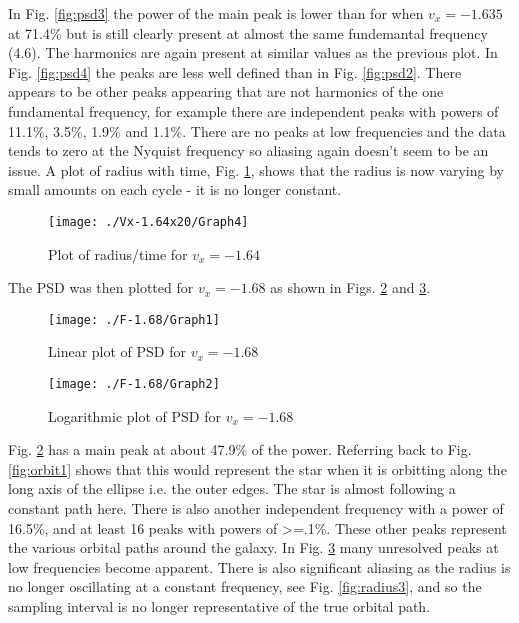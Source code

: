 \documentclass[a4paper,12pt]{article}
\begin{document}
In Fig. \ref{fig:psd3} the power of the main peak is lower than for when $v_x=-1.635$ at 71.4\% but is still clearly present at almost the same fundemantal frequency (4.6). The harmonics are again present at similar values as the previous plot. In Fig. \ref{fig:psd4} the peaks are less well defined than in Fig. \ref{fig:psd2}. There appears to be other peaks appearing that are not harmonics of the one fundamental frequency, for example there are independent peaks with powers of 11.1\%, 3.5\%, 1.9\% and 1.1\%. There are no peaks at low frequencies and the data tends to zero at the Nyquist frequency so aliasing again doesn't seem to be an issue. A plot of radius with time, Fig. \ref{fig:radius2}, shows that the radius is now varying by small amounts on each cycle - it is no longer constant.

\begin{figure}[H]
\centering
\texttt{[image: ./Vx-1.64x20/Graph4]}
\caption{Plot of radius/time for $v_x=-1.64$}
\label{fig:radius2}
\end{figure}

The PSD was then plotted for $v_x=-1.68$ as shown in Figs. \ref{fig:psd5} and \ref{fig:psd6}. 

\begin{figure}[H]
\centering
\texttt{[image: ./F-1.68/Graph1]}
\caption{Linear plot of PSD for $v_x=-1.68$}
\label{fig:psd5}
\end{figure}

\begin{figure}[H]
\centering
\texttt{[image: ./F-1.68/Graph2]}
\caption{Logarithmic plot of PSD for $v_x=-1.68$}
\label{fig:psd6}
\end{figure}

Fig. \ref{fig:psd5} has a main peak at about 47.9\% of the power. Referring back to Fig. \ref{fig:orbit1} shows that this would represent the star when it is orbitting along the long axis of the ellipse i.e. the outer edges. The star is almost following a constant path here. There is also another independent frequency with a power of 16.5\%, and at least 16 peaks with powers of \textgreater=.1\%. These other peaks represent the various orbital paths around the galaxy.
In Fig. \ref{fig:psd6} many unresolved peaks at low frequencies become apparent. There is also significant aliasing as the radius is no longer oscillating at a constant frequency, see Fig. \ref{fig:radius3}, and so the sampling interval is no longer representative of the true orbital path.
\end{document}
